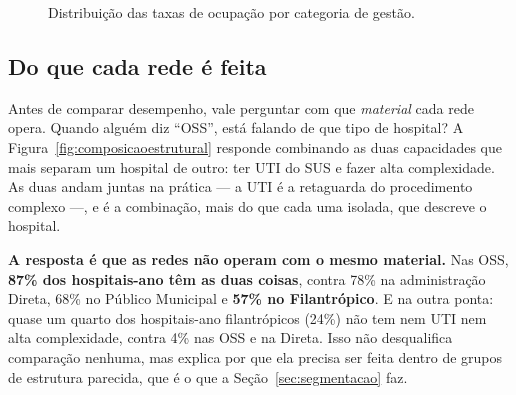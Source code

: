 \begin{figure}[H]
\centering
{}
\caption{Distribuição das taxas de ocupação por categoria de gestão.}
\label{fig:violC}
\end{figure}


\newpage
\subsection*{Do que cada rede é feita}

Antes de comparar desempenho, vale perguntar com que \emph{material} cada
rede opera. Quando alguém diz ``OSS'', está falando de que tipo de
hospital? A Figura~\ref{fig:composicaoestrutural} responde combinando as
duas capacidades que mais separam um hospital de outro: ter UTI do SUS e
fazer alta complexidade. As duas andam juntas na prática --- a UTI é a
retaguarda do procedimento complexo ---, e é a combinação, mais do que
cada uma isolada, que descreve o hospital.

\textbf{A resposta é que as redes não operam com o mesmo material.} Nas
OSS, \textbf{87\% dos hospitais-ano têm as duas coisas}, contra 78\% na
administração Direta, 68\% no Público Municipal e \textbf{57\% no
Filantrópico}. E na outra ponta: quase um quarto dos hospitais-ano
filantrópicos (24\%) não tem nem UTI nem alta complexidade, contra 4\% nas
OSS e na Direta. Isso não desqualifica comparação nenhuma, mas explica por
que ela precisa ser feita dentro de grupos de estrutura parecida, que é o
que a Seção~\ref{sec:segmentacao} faz.


